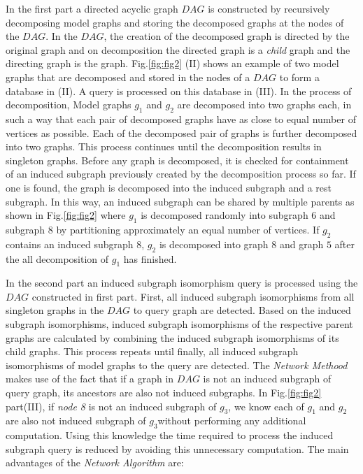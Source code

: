 In the first part a directed acyclic graph $DAG$ is constructed by recursively decomposing model graphs and storing the decomposed graphs at the nodes of the $DAG$.
In the $DAG$, the creation of the decomposed graph is directed by the original graph and on decomposition the directed graph is a \textit{child} graph and the directing graph is the  graph. 
Fig.\ref{fig:fig2} (II) shows an example of two model graphs that are decomposed and stored in the nodes of a $DAG$ to form a database in (II). A query is processed on this database in (III).
In the process of decomposition, Model graphs $g_1$ and $g_2$ are decomposed into two graphs each, in such a way that each pair of decomposed graphs have as close to equal number of vertices  as possible.
Each of the decomposed pair of graphs is further decomposed into two graphs.
This process continues until the decomposition results in singleton graphs.
Before any graph is decomposed, it is checked for containment of an induced subgraph previously created by the decomposition process so far. If one is found, the graph is decomposed into the induced subgraph and a rest subgraph. In this way, an induced subgraph can be shared by multiple parents as shown in Fig.\ref{fig:fig2} where $g_1$ is decomposed randomly into subgraph $6$ and subgraph $8$ by partitioning approximately an equal number of vertices.
If $g_2$ contains an induced subgraph $8$, $g_2$ is decomposed into graph $8$ and graph $5$ after the all decomposition of $g_1$ has finished.

In the second part an induced subgraph isomorphism query is processed using the $DAG$ constructed in first part.
First, all induced subgraph isomorphisms from all singleton graphs in the $DAG$ to query graph are detected.
Based on the induced subgraph isomorphisms, induced subgraph isomorphisms of the respective parent graphs are calculated by combining the induced subgraph isomorphisms of its child graphs. This process repeats until finally, all induced subgraph isomorphisms of model graphs to the query are detected.
The \textit{Network Methood} makes use of the fact that if a graph in $DAG$ is not an induced subgraph of query graph, its ancestors are also not induced subgraphs.
In Fig.\ref{fig:fig2} part(III), if \textit{node 8} is not an induced subgraph of $g_3$, we know each of $g_1$ and $g_2$ are also not induced subgraph of $g_3$without performing any additional computation. Using this knowledge the time required to process the induced subgraph query is reduced by avoiding this unnecessary computation. The main advantages of the \textit{Network Algorithm}  are:  

